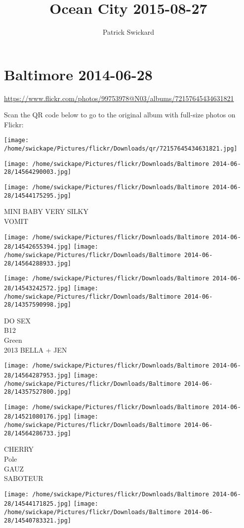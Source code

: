 \documentclass[10pt,letterpaper]{article}
\title{Ocean City 2015-08-27}
\author{Patrick Swickard}
\date{}
\begin{document}
\section*{Baltimore 2014-06-28}

\url{https://www.flickr.com/photos/99753978@N03/albums/72157645434631821}

Scan the QR code below to go to the original album with full-size photos on Flickr:

\texttt{[image: /home/swickape/Pictures/flickr/Downloads/qr/72157645434631821.jpg]}
\pagebreak

\texttt{[image: /home/swickape/Pictures/flickr/Downloads/Baltimore 2014-06-28/14564290003.jpg]}

\vspace{0.25in}
\texttt{[image: /home/swickape/Pictures/flickr/Downloads/Baltimore 2014-06-28/14544175295.jpg]}

MINI BABY VERY SILKY\\
VOMIT
\pagebreak

\texttt{[image: /home/swickape/Pictures/flickr/Downloads/Baltimore 2014-06-28/14542655394.jpg]}
\texttt{[image: /home/swickape/Pictures/flickr/Downloads/Baltimore 2014-06-28/14564288933.jpg]}

\texttt{[image: /home/swickape/Pictures/flickr/Downloads/Baltimore 2014-06-28/14543242572.jpg]}
\texttt{[image: /home/swickape/Pictures/flickr/Downloads/Baltimore 2014-06-28/14357590998.jpg]}

DO SEX\\
B12\\
Green\\
2013 BELLA + JEN
\pagebreak

\texttt{[image: /home/swickape/Pictures/flickr/Downloads/Baltimore 2014-06-28/14564287953.jpg]}
\texttt{[image: /home/swickape/Pictures/flickr/Downloads/Baltimore 2014-06-28/14357527800.jpg]}

\texttt{[image: /home/swickape/Pictures/flickr/Downloads/Baltimore 2014-06-28/14521080176.jpg]}
\texttt{[image: /home/swickape/Pictures/flickr/Downloads/Baltimore 2014-06-28/14564286733.jpg]}

CHERRY\\
Pole\\
GAUZ\\
SABOTEUR
\pagebreak

\texttt{[image: /home/swickape/Pictures/flickr/Downloads/Baltimore 2014-06-28/14544171825.jpg]}
\texttt{[image: /home/swickape/Pictures/flickr/Downloads/Baltimore 2014-06-28/14540783321.jpg]}
\end{document}
